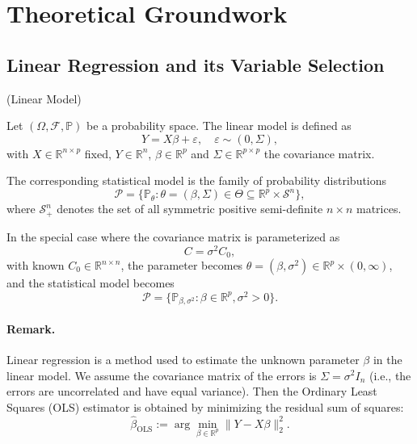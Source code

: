 \section{Theoretical Groundwork}
\label{sec:theoretical-groundwork}


\subsection{Linear Regression and its Variable Selection}

\begin{defn}{(Linear Model)}

Let $(\Omega, \mathcal{F}, \mathbb{P})$ be a probability space. The linear model is defined as
\[ Y = X\beta + \varepsilon, \quad \varepsilon \sim (0, \Sigma), \]
with $X \in \mathbb{R}^{n \times p}$ fixed, $Y \in \mathbb{R}^n$, $\beta \in \mathbb{R}^p$ and $\Sigma \in \mathbb{R}^{p\times p}$ the covariance matrix.

The corresponding statistical model is the family of probability distributions
\[
\mathcal{P} = \{ \mathbb{P}_\theta : \theta = (\beta, \Sigma) \in \Theta \subseteq \mathbb{R}^p \times \mathcal{S}^n \},
\]
where \( \mathcal{S}_{+}^n \) denotes the set of all symmetric positive semi-definite \( n \times n \) matrices.
\end{defn}

In the special case where the covariance matrix is parameterized as
\[
C = \sigma^2 C_0,
\]
with known \( C_0 \in \mathbb{R}^{n \times n} \), the parameter becomes \( \theta = (\beta, \sigma^2) \in \mathbb{R}^p \times (0, \infty) \), and the statistical model becomes
\[
\mathcal{P} = \{ \mathbb{P}_{\beta, \sigma^2} : \beta \in \mathbb{R}^p, \sigma^2 > 0 \}.
\]

\paragraph{Remark.}
Linear regression is a method used to estimate the unknown parameter \( \beta \) in the linear model. We assume the covariance matrix of the errors is \(\Sigma = \sigma^2 I_n\) (i.e., the errors are uncorrelated and have equal variance). Then the Ordinary Least Squares (OLS) estimator is obtained by minimizing the residual sum of squares:
\[
\hat{\beta}_{\text{OLS}} := \arg\min_{\beta \in \mathbb{R}^p} \| Y - X\beta \|_2^2.
\]

